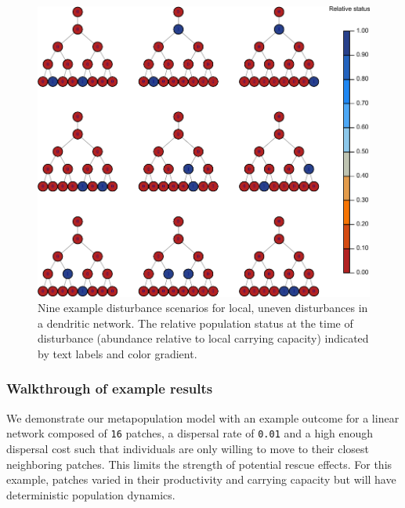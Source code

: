 \documentclass[
]{article}
\begin{document}
\begin{figure}[H]

{\centering \includegraphics{Managing_for_ecological_surprises_in_metapopulations_files/figure-latex/example uneven spatial disturbance-1} 

}

\caption{Nine example disturbance scenarios for local, uneven disturbances in a dendritic network. The relative population status at the time of disturbance (abundance relative to local carrying capacity) indicated by text labels and color gradient.}\label{fig:example uneven spatial disturbance}
\end{figure}

\hypertarget{walkthrough-of-example-results}{%
\subsubsection{Walkthrough of example
results}\label{walkthrough-of-example-results}}

We demonstrate our metapopulation model with an example outcome for a
linear network composed of \texttt{16} patches, a dispersal rate of
\texttt{0.01} and a high enough dispersal cost such that individuals are
only willing to move to their closest neighboring patches. This limits
the strength of potential rescue effects. For this example, patches
varied in their productivity and carrying capacity but will have
deterministic population dynamics.
\end{document}
